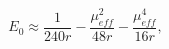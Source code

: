 \begin{equation}
E_{0}\approx \frac{1}{240r}-\frac{\mu _{eff}^{2}}{48r}-\frac{\mu _{eff}^{4}}{16r},\end{equation}

